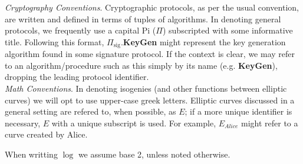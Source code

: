 \vspace{15px}

\noindent
\textit{Cryptography Conventions}. Cryptographic protocols, as per the usual convention, are written and defined in terms of tuples of algorithms. In denoting general protocols, we frequently use a capital Pi ($\Pi$) subscripted with some informative title. Following this format, $\Pi_{\text{sig}}$.\textbf{KeyGen} might represent the key generation algorithm found in some signature protocol. If the context is clear, we may refer to an algorithm/procedure such as this simply by its name (e.g. \textbf{KeyGen}), dropping the leading protocol identifier.\\

\noindent
\textit{Math Conventions}. In denoting isogenies (and other functions between elliptic curves) we will opt to use upper-case greek letters. Elliptic curves discussed in a general setting are refered to, when possible, as $E$; if a more unique identifier is necessary, $E$ with a unique subscript is used. For example, $E_{Alice}$ might refer to a curve created by Alice.  

When writting $\log$ we assume base 2, unless noted otherwise.




